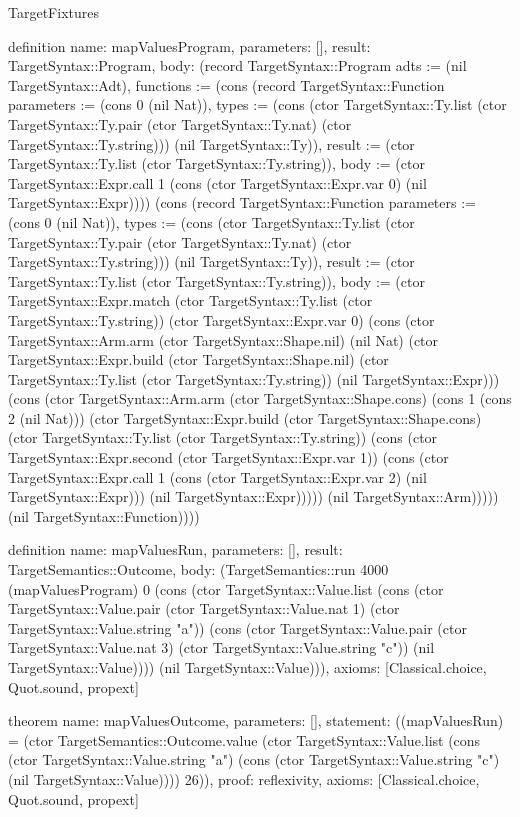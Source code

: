 \begin{lexlean}{TargetFixtures}
\begin{semanticmodule}
definition{
  name: mapValuesProgram,
  parameters: [],
  result: TargetSyntax::Program,
  body: (record TargetSyntax::Program {adts := (nil TargetSyntax::Adt), functions := (cons (record TargetSyntax::Function {parameters := (cons 0 (nil Nat)), types := (cons (ctor TargetSyntax::Ty.list (ctor TargetSyntax::Ty.pair (ctor TargetSyntax::Ty.nat) (ctor TargetSyntax::Ty.string))) (nil TargetSyntax::Ty)), result := (ctor TargetSyntax::Ty.list (ctor TargetSyntax::Ty.string)), body := (ctor TargetSyntax::Expr.call 1 (cons (ctor TargetSyntax::Expr.var 0) (nil TargetSyntax::Expr)))}) (cons (record TargetSyntax::Function {parameters := (cons 0 (nil Nat)), types := (cons (ctor TargetSyntax::Ty.list (ctor TargetSyntax::Ty.pair (ctor TargetSyntax::Ty.nat) (ctor TargetSyntax::Ty.string))) (nil TargetSyntax::Ty)), result := (ctor TargetSyntax::Ty.list (ctor TargetSyntax::Ty.string)), body := (ctor TargetSyntax::Expr.match (ctor TargetSyntax::Ty.list (ctor TargetSyntax::Ty.string)) (ctor TargetSyntax::Expr.var 0) (cons (ctor TargetSyntax::Arm.arm (ctor TargetSyntax::Shape.nil) (nil Nat) (ctor TargetSyntax::Expr.build (ctor TargetSyntax::Shape.nil) (ctor TargetSyntax::Ty.list (ctor TargetSyntax::Ty.string)) (nil TargetSyntax::Expr))) (cons (ctor TargetSyntax::Arm.arm (ctor TargetSyntax::Shape.cons) (cons 1 (cons 2 (nil Nat))) (ctor TargetSyntax::Expr.build (ctor TargetSyntax::Shape.cons) (ctor TargetSyntax::Ty.list (ctor TargetSyntax::Ty.string)) (cons (ctor TargetSyntax::Expr.second (ctor TargetSyntax::Expr.var 1)) (cons (ctor TargetSyntax::Expr.call 1 (cons (ctor TargetSyntax::Expr.var 2) (nil TargetSyntax::Expr))) (nil TargetSyntax::Expr))))) (nil TargetSyntax::Arm))))}) (nil TargetSyntax::Function)))})
}

definition{
  name: mapValuesRun,
  parameters: [],
  result: TargetSemantics::Outcome,
  body: (TargetSemantics::run 4000 (mapValuesProgram) 0 (cons (ctor TargetSyntax::Value.list (cons (ctor TargetSyntax::Value.pair (ctor TargetSyntax::Value.nat 1) (ctor TargetSyntax::Value.string "a")) (cons (ctor TargetSyntax::Value.pair (ctor TargetSyntax::Value.nat 3) (ctor TargetSyntax::Value.string "c")) (nil TargetSyntax::Value)))) (nil TargetSyntax::Value))),
  axioms: [Classical.choice, Quot.sound, propext]
}

theorem{
  name: mapValuesOutcome,
  parameters: [],
  statement: ((mapValuesRun) = (ctor TargetSemantics::Outcome.value (ctor TargetSyntax::Value.list (cons (ctor TargetSyntax::Value.string "a") (cons (ctor TargetSyntax::Value.string "c") (nil TargetSyntax::Value)))) 26)),
  proof: reflexivity{},
  axioms: [Classical.choice, Quot.sound, propext]
}


\end{semanticmodule}
\end{lexlean}
